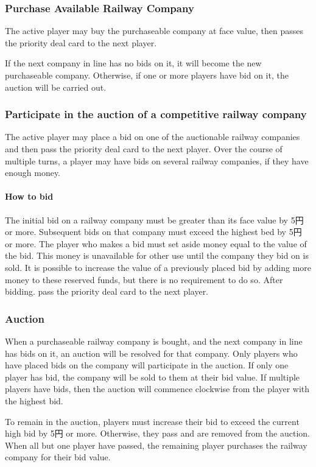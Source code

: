 \documentclass{article}
\begin{document}
\begin{CJK}{UTF8}{min}
\begin{multicols}{2}
\subsubsection{Purchase Available Railway Company}
The active player may buy the purchaseable company at face value, then
passes the priority deal card to the next player.

If the next company in line has no bids on it, it will become the new
purchaseable company. Otherwise, if one or more players have bid on
it, the auction will be carried out.

\subsubsection{Participate in the auction of a competitive railway company}
The active player may place a bid on one of the auctionable railway
companies and then pass the priority deal card to the next
player. Over the course of multiple turns, a player may have bids on
several railway companies, if they have enough money.

\paragraph{How to bid}\label{isr-bidding}

The initial bid on a railway company must be greater than its face
value by 5円 or more. Subsequent bids on that company must exceed
the highest bed by 5円 or more. The player who makes a bid must set
aside money equal to the value of the bid. This money is unavailable
for other use until the company they bid on is sold. It is possible to
increase the value of a previously placed bid by adding more money to
these reserved funds, but there is no requirement to do so. After
bidding. pass the priority deal card to the next player.

\subsubsection{Auction}
When a purchaseable railway company is bought, and the next company in
line has bids on it, an auction will be resolved for that
company. Only players who have placed bids on the company will
participate in the auction. If only one player has bid, the company
will be sold to them at their bid value. If multiple players have
bids, then the auction will commence clockwise from the player with
the highest bid.

To remain in the auction, players must increase their bid to exceed
the current high bid by 5円 or more. Otherwise, they pass and are
removed from the auction. When all but one player have passed, the
remaining player purchases the railway company for their bid value.


\end{multicols}
\end{CJK}
\end{document}
